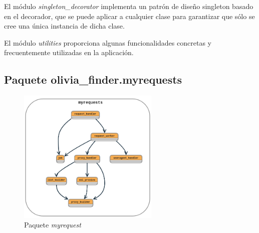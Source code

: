 El módulo \textit{singleton\_decorator} implementa un patrón de diseño singleton basado
en el decorador, que se puede aplicar a cualquier clase para garantizar que sólo se cree una
única instancia de dicha clase.

El módulo \textit{utilities} proporciona algunas funcionalidades concretas y frecuentemente
utilizadas en la aplicación.

\subsection{Paquete olivia\_finder.myrequests}

\begin{figure}[ht!]
    \centering
    \includegraphics[width=0.6\textwidth]{img/anexos/myrequest.png}
    \caption{Paquete \textit{myrequest}}
    \label{fig:myrequests}
\end{figure}

